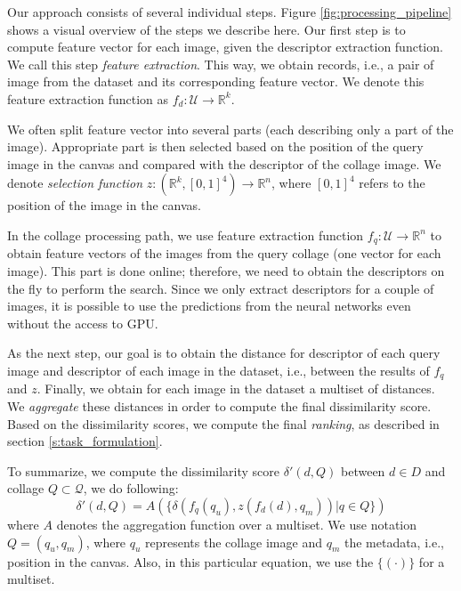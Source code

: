 Our approach consists of several individual steps. Figure \ref{fig:processing_pipeline} shows a visual overview of the steps we describe here. Our first step is to compute feature vector for each image, given the descriptor extraction function. We call this step \emph{feature extraction}. This way, we obtain records, i.e., a pair of image from the dataset and its corresponding feature vector. We denote this feature extraction function as $f_d:\mathcal{U} \rightarrow \mathbb{R}^k$.

We often split feature vector into several parts (each describing only a part of the image). Appropriate part is then selected based on the position of the query image in the canvas and compared with the descriptor of the collage image. We denote \emph{selection function} $z: (\mathbb{R}^k, [0,1]^4) \rightarrow \mathbb{R}^n$, where $[0,1]^4$ refers to the position of the image in the canvas.


In the collage processing path, we use feature extraction function $f_q: \mathcal{U} \rightarrow \mathbb{R}^n$ to obtain feature vectors of the images from the query collage (one vector for each image). This part is done online; therefore, we need to obtain the descriptors on the fly to perform the search. Since we only extract descriptors for a couple of images, it is possible to use the predictions from the neural networks even without the access to GPU.

As the next step, our goal is to obtain the distance for descriptor of each query image and descriptor of each image in the dataset, i.e., between the results of $f_q$ and $z$. Finally, we obtain for each image in the dataset a multiset of distances. We \emph{aggregate} these distances in order to compute the final dissimilarity score. Based on the dissimilarity scores, we compute the final \emph{ranking}, as described in section \ref{s:task_formulation}.

To summarize, we compute the dissimilarity score $\delta'(d, Q)$ between $d \in D$ and collage $Q \subset \mathcal{Q}$, we do following:
$$
   \delta'(d, Q) = A(\{\delta(f_q(q_u), z(f_d(d), q_m))|q\in Q\})
$$
where $A$ denotes the aggregation function over a multiset. We use notation $Q = (q_u, q_m)$, where $q_u$ represents the collage image and $q_m$ the metadata, i.e., position in the canvas. Also, in this particular equation, we use the $\{(\cdot)\}$ for a multiset.

